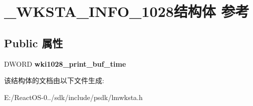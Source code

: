 \hypertarget{struct___w_k_s_t_a___i_n_f_o__1028}{}\section{\+\_\+\+W\+K\+S\+T\+A\+\_\+\+I\+N\+F\+O\+\_\+1028结构体 参考}
\label{struct___w_k_s_t_a___i_n_f_o__1028}
\subsection*{Public 属性}
\begin{DoxyCompactItemize}
\item 
\mbox{\label{struct___w_k_s_t_a___i_n_f_o__1028_af785219a2d4c36249b7904d65b74d114}} 
D\+W\+O\+RD {\bfseries wki1028\+\_\+print\+\_\+buf\+\_\+time}
\end{DoxyCompactItemize}


该结构体的文档由以下文件生成\+:\begin{DoxyCompactItemize}
\item 
E\+:/\+React\+O\+S-\/0../sdk/include/psdk/lmwksta.\+h\end{DoxyCompactItemize}
